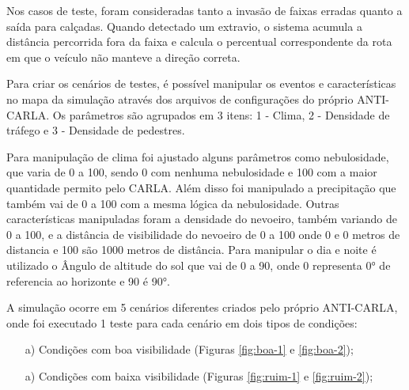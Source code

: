 \documentclass[a4paper,12pt,Times]{article}
\begin{document}

Nos casos de teste, foram consideradas tanto a invasão de faixas erradas quanto a saída para calçadas. Quando detectado um extravio, o sistema acumula a distância percorrida fora da faixa e calcula o percentual correspondente da rota em que o veículo não manteve a direção correta.


Para criar os cenários de testes, é possível manipular os eventos e características no mapa da simulação através dos arquivos de configurações do próprio ANTI-CARLA. Os parâmetros são agrupados em 3 itens: 1 - Clima, 2 - Densidade de tráfego e 3 - Densidade de pedestres.


Para manipulação de clima foi ajustado alguns parâmetros como nebulosidade, que varia de 0 a 100, sendo 0 com nenhuma nebulosidade e 100 com a maior quantidade permito pelo CARLA. Além disso foi manipulado a precipitação que também vai de 0 a 100 com a mesma lógica da nebulosidade. Outras características manipuladas foram a densidade do nevoeiro, também variando de 0 a 100, e a distância de visibilidade do nevoeiro de 0 a 100 onde 0 e 0 metros de distancia e 100 são 1000 metros de distância. Para manipular o dia e noite é utilizado o Ângulo de altitude do sol que vai de 0 a 90, onde 0 representa 0° de referencia ao horizonte e 90 é 90°.

A simulação ocorre em 5 cenários diferentes criados pelo próprio ANTI-CARLA, onde foi executado 1 teste para cada cenário em dois tipos de condições:

\begin{enumerate}
    \item[a)] Condições com boa visibilidade (Figuras \ref{fig:boa-1} e \ref{fig:boa-2});
    \item[a)] Condições com baixa visibilidade (Figuras \ref{fig:ruim-1} e \ref{fig:ruim-2});
\end{enumerate}
\end{document}
